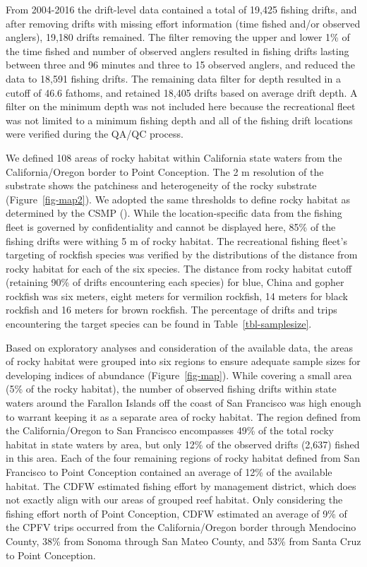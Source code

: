 \documentclass[
  12pt,
  authoryear,
  preprint,
  3p]{elsarticle}
\begin{document}
From 2004-2016 the drift-level data contained a total of 19,425 fishing
drifts, and after removing drifts with missing effort information (time
fished and/or observed anglers), 19,180 drifts remained. The filter
removing the upper and lower 1\% of the time fished and number of
observed anglers resulted in fishing drifts lasting between three and 96
minutes and three to 15 observed anglers, and reduced the data to 18,591
fishing drifts. The remaining data filter for depth resulted in a cutoff
of 46.6 fathoms, and retained 18,405 drifts based on average drift
depth. A filter on the minimum depth was not included here because the
recreational fleet was not limited to a minimum fishing depth and all of
the fishing drift locations were verified during the QA/QC process.

We defined 108 areas of rocky habitat within California state waters
from the California/Oregon border to Point Conception. The 2 m
resolution of the substrate shows the patchiness and heterogeneity of
the rocky substrate (Figure~\ref{fig-map2}). We adopted the same
thresholds to define rocky habitat as determined by the CSMP
(\citet{CSUMB:2014:CSM}). While the location-specific data from the
fishing fleet is governed by confidentiality and cannot be displayed
here, 85\% of the fishing drifts were withing 5 m of rocky habitat. The
recreational fishing fleet's targeting of rockfish species was verified
by the distributions of the distance from rocky habitat for each of the
six species. The distance from rocky habitat cutoff (retaining 90\% of
drifts encountering each species) for blue, China and gopher rockfish
was six meters, eight meters for vermilion rockfish, 14 meters for black
rockfish and 16 meters for brown rockfish. The percentage of drifts and
trips encountering the target species can be found in
Table~\ref{tbl-samplesize}.

Based on exploratory analyses and consideration of the available data,
the areas of rocky habitat were grouped into six regions to ensure
adequate sample sizes for developing indices of abundance
(Figure~\ref{fig-map}). While covering a small area (5\% of the rocky
habitat), the number of observed fishing drifts within state waters
around the Farallon Islands off the coast of San Francisco was high
enough to warrant keeping it as a separate area of rocky habitat. The
region defined from the California/Oregon to San Francisco encompasses
49\% of the total rocky habitat in state waters by area, but only 12\%
of the observed drifts (2,637) fished in this area. Each of the four
remaining regions of rocky habitat defined from San Francisco to Point
Conception contained an average of 12\% of the available habitat. The
CDFW estimated fishing effort by management district, which does not
exactly align with our areas of grouped reef habitat. Only considering
the fishing effort north of Point Conception, CDFW estimated an average
of 9\% of the CPFV trips occurred from the California/Oregon border
through Mendocino County, 38\% from Sonoma through San Mateo County, and
53\% from Santa Cruz to Point Conception.
\end{document}
